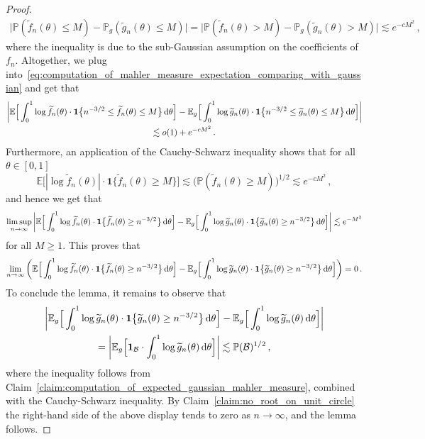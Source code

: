 \documentclass[11pt]{amsart}
\theoremstyle{remark}
\theoremstyle{definition}
\newcommand{\bP}{\mathbb P}
\newcommand{\bE}{\mathbb E}
\newcommand{\cB}{\mathcal B}
\newcommand{\one}{\boldsymbol{1}}
\begin{document}
\begin{proof}
        \begin{align*}
            \big|\bP(\widetilde f_n(\theta) \le M) - \bP_g(\widetilde g_n(\theta) \le M) \big| = \big|\bP(\widetilde f_n(\theta) > M) - \bP_g(\widetilde g_n(\theta) > M)  \big| \lesssim e^{-cM^2} \, ,
        \end{align*}
        where the inequality is due to the sub-Gaussian assumption on the coefficients of $f_n$. Altogether, we plug into~\eqref{eq:computation_of_mahler_measure_expectation_comparing_with_gaussian} and get that
       \begin{multline*}
           \bigg| \bE\Big[ \int_{0}^1 \log \widetilde{f}_n(\theta) \cdot \one\big\{  n^{-3/2} \le \widetilde f_n(\theta) \le M \big\} \, {\rm d}\theta \Big] - \bE_g\Big[ \int_{0}^1 \log \widetilde{g}_n(\theta) \cdot   \one\big\{  n^{-3/2} \le \widetilde g_n(\theta) \le M \big\} \, {\rm d}\theta \Big] \bigg| \\  \lesssim o(1) + e^{-cM^2} \, .
       \end{multline*} 
       Furthermore, an application of the Cauchy-Schwarz inequality shows that for all $\theta\in[0,1]$
       \[
       \bE\big[|\log \widetilde f_n(\theta)| \cdot \one \{\widetilde f_n(\theta)\ge M \}\big] \lesssim \big(\bP(\widetilde f_n(\theta)\ge M)\big)^{1/2} \lesssim e^{-cM^2} \, ,
       \]
       and hence we get that
       \begin{equation*}
           \limsup_{n\to\infty} \bigg| \bE\Big[ \int_{0}^1 \log \widetilde{f}_n(\theta) \cdot  \one\big\{ \widetilde f_n(\theta) \ge n^{-3/2}\big\} \, {\rm d}\theta \Big] - \bE_g\Big[ \int_{0}^1 \log \widetilde{g}_n(\theta) \cdot  \one\big\{ \widetilde g_n(\theta) \ge n^{-3/2}\big\} \, {\rm d}\theta \Big] \bigg| \lesssim e^{-M^2}
       \end{equation*}
       for all $M\ge 1$. This proves that 
       \[
       \lim_{n\to \infty} \bigg(\bE\Big[ \int_{0}^1 \log \widetilde{f}_n(\theta) \cdot  \one\big\{ \widetilde f_n(\theta) \ge n^{-3/2}\big\} \, {\rm d}\theta \Big] - \bE_g\Big[ \int_{0}^1 \log \widetilde{g}_n(\theta) \cdot  \one\big\{ \widetilde g_n(\theta) \ge n^{-3/2}\big\} \, {\rm d}\theta \Big] \bigg) = 0 \, .
       \]
       To conclude the lemma, it remains to observe that 
       \begin{multline*}
        \bigg|  \bE_g\Big[ \int_{0}^1 \log \widetilde{g}_n(\theta) \cdot  \one\big\{ \widetilde g_n(\theta) \ge n^{-3/2}\big\} \, {\rm d}\theta \Big]-\bE_g\Big[ \int_{0}^1 \log \widetilde{g}_n(\theta)\, {\rm d}\theta \Big]  \bigg|  \\ = \bigg|\bE_g\Big[ \one_{\cB} \cdot \int_{0}^1 \log \widetilde{g}_n(\theta)\, {\rm d}\theta \Big]\bigg|   \lesssim \bP(\cB)^{1/2}  \, ,
       \end{multline*}
       where the inequality follows from Claim~\ref{claim:computation_of_expected_gaussian_mahler_measure}, combined with the Cauchy-Schwarz inequality. By Claim~\ref{claim:no_root_on_unit_circle} the right-hand side of the above display tends to zero as $n\to\infty$, and the lemma follows.  
    \end{proof}
\end{document}
